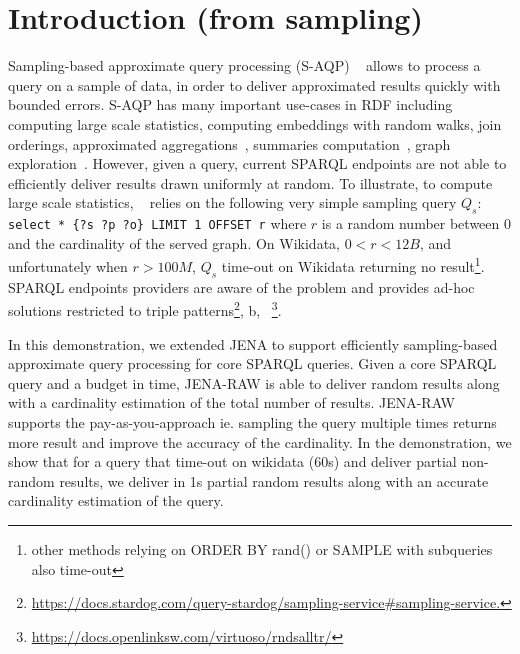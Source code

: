 
\section{Introduction (from sampling)}

Sampling-based approximate query processing (S-AQP)
~\cite{DBLP:conf/sigmod/AgarwalMKTJMMS14} allows to process a query on
a sample of data, in order to deliver approximated results quickly with
bounded errors. S-AQP has many important use-cases in RDF including
computing large scale
statistics\cite{soulet2019anytime,10.1007/978-3-319-18818-8_14},
computing embeddings with random walks\cite{ristoski2016rdf2vec}, join
orderings\cite{DBLP:conf/cidr/LeisRGK017}, approximated
aggregations~\cite{DBLP:journals/tods/LiWYZ19}, summaries
computation~\cite{10.1007/978-3-030-49461-2_10}, graph
exploration~\cite{??}. 
However, given a query, current SPARQL endpoints are not able to efficiently deliver
results drawn uniformly at random. To illustrate, to
compute large scale statistics, ~\cite{soulet2019anytime} relies on
the following very simple sampling query $Q_s$:
%
\verb+select * {?s ?p ?o} LIMIT 1 OFFSET r+
%
where $r$ is a random number between 0 and the cardinality of the
served graph. On Wikidata, $0<r<12B$, and
unfortunately when $r>100M$, $Q_s$ time-out on Wikidata returning no
result\footnote{other methods relying on ORDER BY rand() or SAMPLE
  with subqueries also time-out}. SPARQL endpoints providers are aware
of the problem and provides ad-hoc solutions restricted to triple
patterns\footnote{\url{https://docs.stardog.com/query-stardog/sampling-service\#sampling-service.}},
b, ~\footnote{\url{https://docs.openlinksw.com/virtuoso/rndsalltr/}}.


In this demonstration, we extended JENA to support efficiently
sampling-based approximate query processing for core SPARQL queries.
Given a core SPARQL query and a budget in time, JENA-RAW is able to
deliver random results along with a cardinality estimation of the
total number of results. JENA-RAW supports the pay-as-you-approach
ie. sampling the query multiple times returns more result and improve
the accuracy of the cardinality.
%
In the demonstration, we show that for a query that time-out on
wikidata (60s) and deliver partial non-random results, we deliver in
1s partial random results along with an accurate cardinality
estimation of the query. 






